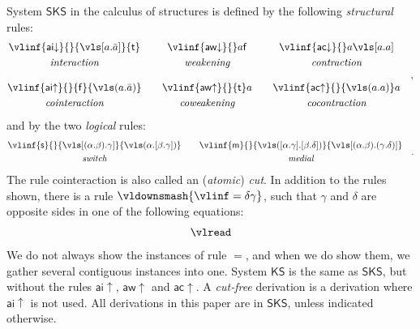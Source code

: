 \documentclass[a4paper]{LMCS}
\begin{document}
\begin{defi}
System ${\mathsf{SKS}}$ in the calculus of structures is defined by the following \emph{structural} rules:
\[
\begin{array}{@{}c@{}c@{}c@{}}
      \vlinf{{{\mathsf{ai}}{\downarrow}}}{}{\vls[a.{\bar a}]}{\mathsf t}&
\qquad\vlinf{{{\mathsf{aw}}{\downarrow}}}{}a{\mathsf f}&
\qquad\vlinf{{{\mathsf{ac}}{\downarrow}}}{}a{\vls[a.a]}\\
\noalign{\smallskip}
      \emph{interaction}&
\qquad\emph{weakening}&
\qquad\emph{contraction}\\
\noalign{\bigskip}
      \vlinf{{{\mathsf{ai}}{\uparrow}}}{}{\mathsf f}{\vls(a.{\bar a})}&
\qquad\vlinf{{{\mathsf{aw}}{\uparrow}}}{}{\mathsf t} a&
\qquad\vlinf{{{\mathsf{ac}}{\uparrow}}}{}{\vls (a.a)}a\\
\noalign{\smallskip}
      \emph{cointeraction}&
\qquad\emph{coweakening}&
\qquad\emph{cocontraction}\\
\end{array}\quad,
\]
and by the two \emph{logical} rules:
\[
\begin{array}{@{}c@{}c@{}}
\vlinf{\mathsf{s}}{}{\vls[(\alpha.\beta).\gamma]}{\vls(\alpha.[\beta.\gamma])}&\qquad
\vlinf{\mathsf{m}}{}{\vls([\alpha.\gamma].[\beta.\delta])}
              {\vls[(\alpha.\beta).(\gamma.\delta)]}\\
\noalign{\smallskip}
\emph{switch}&\qquad\emph{medial}\\
\end{array}\quad.
\]
The rule cointeraction is also called an (\emph{atomic}) \emph{cut}. In addition to the rules shown, there is a rule $\vldownsmash{\vlinf={}\delta\gamma}$, such that $\gamma$ and $\delta$ are opposite sides in one of the following equations:
\begin{align*}
\vlread
\end{align*}
We do not always show the instances of rule $=$, and when we do show them, we gather several contiguous instances into one. System ${\mathsf{KS}}$ is the same as ${\mathsf{SKS}}$, but without the rules ${{{\mathsf{ai}}{\uparrow}}}$, ${{{\mathsf{aw}}{\uparrow}}}$ and ${{{\mathsf{ac}}{\uparrow}}}$. A \emph{cut-free} derivation is a derivation where ${{{\mathsf{ai}}{\uparrow}}}$ is not used. All derivations in this paper are in ${\mathsf{SKS}}$, unless indicated otherwise.
\end{defi}
\end{document}
